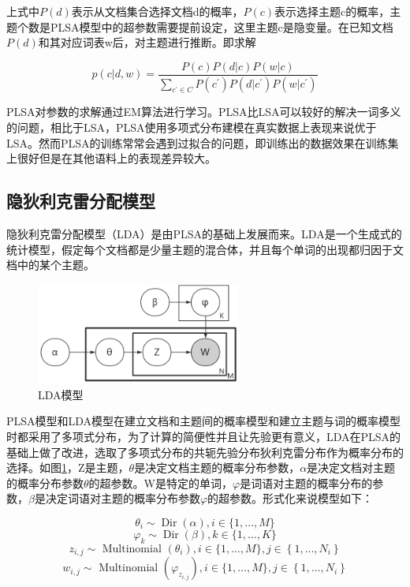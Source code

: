 \documentclass[winfonts,master,oneside,nobackinfo]{njuthesis}
\begin{document}
上式中$P ( d )$表示从文档集合选择文档d的概率，$P ( c )$表示选择主题c的概率，主题个数是PLSA模型中的超参数需要提前设定，这里主题c是隐变量。在已知文档$P ( d )$和其对应词表w后，对主题进行推断。即求解

$$p ( c | d , w ) = \frac { P ( c ) P ( d | c ) P ( w | c ) } { \sum _ { c ^ { \prime } \in C } P \left( c ^ { \prime } \right) P ( d | c ^ { \prime } ) P ( w | c ^ { \prime } ) }$$

PLSA对参数的求解通过EM算法进行学习。PLSA比LSA可以较好的解决一词多义的问题，相比于LSA，PLSA使用多项式分布建模在真实数据上表现来说优于LSA。然而PLSA的训练常常会遇到过拟合的问题，即训练出的数据效果在训练集上很好但是在其他语料上的表现差异较大。

\subsection{隐狄利克雷分配模型}

隐狄利克雷分配模型（LDA）是由PLSA的基础上发展而来。LDA是一个生成式的统计模型，假定每个文档都是少量主题的混合体，并且每个单词的出现都归因于文档中的某个主题。

\begin{figure}[h]
\centering
\includegraphics[width=0.6\textwidth]{./figure/lda.jpg}
\caption{LDA模型}
\label{lda}
\end{figure}

PLSA模型和LDA模型在建立文档和主题间的概率模型和建立主题与词的概率模型时都采用了多项式分布，为了计算的简便性并且让先验更有意义，LDA在PLSA的基础上做了改进，选取了多项式分布的共轭先验分布狄利克雷分布作为概率分布的选择。如图\ref{lda}，Z是主题，$\theta$是决定文档主题的概率分布参数，$\alpha$是决定文档对主题的概率分布参数$\theta$的超参数。W是特定的单词，$\varphi$是词语对主题的概率分布的参数，$\beta$是决定词语对主题的概率分布参数$\varphi$的超参数。形式化来说模型如下：

$$\theta _ { i } \sim \operatorname { Dir } ( \alpha ), i \in \{ 1 , \ldots , M \}$$
$$\varphi _ { k } \sim \operatorname { Dir } ( \beta ), k \in \{ 1 , \ldots , K \}$$
$$z _ { i , j } \sim \text { Multinomial } \left( \theta _ { i } \right), i \in \{ 1 , \ldots , M \},j \in \left\{ 1 , \ldots , N _ { i } \right\}$$
$$w _ { i , j } \sim \text { Multinomial } \left( \varphi _ { z _ { i , j } } \right), i \in \{ 1 , \ldots , M \},j \in \left\{ 1 , \ldots , N _ { i } \right\} $$
\end{document}
